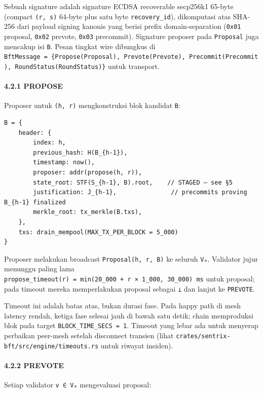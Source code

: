 \documentclass[11pt,a4paper]{article}
\begin{document}
Sebuah signature adalah signature ECDSA recoverable secp256k1 65-byte (compact \texttt{(r,\ s)} 64-byte plus satu byte \texttt{recovery\_id}), dikomputasi atas SHA-256 dari payload signing kanonis yang berisi prefix domain-separation (\texttt{0x01} proposal, \texttt{0x02} prevote, \texttt{0x03} precommit). Signature proposer pada \texttt{Proposal} juga mencakup isi \texttt{B}. Pesan tingkat wire dibungkus di \texttt{BftMessage\ =\ \{Propose(Proposal),\ Prevote(Prevote),\ Precommit(Precommit),\ RoundStatus(RoundStatus)\}} untuk transport.

\hypertarget{propose}{%
\paragraph{4.2.1 PROPOSE}\label{propose}}

Proposer untuk \texttt{(h,\ r)} mengkonstruksi blok kandidat \texttt{B}:

\begin{verbatim}
B = {
    header: {
        index: h,
        previous_hash: H(B_{h-1}),
        timestamp: now(),
        proposer: addr(propose(h, r)),
        state_root: STF(S_{h-1}, B).root,    // STAGED — see §5
        justification: J_{h-1},               // precommits proving B_{h-1} finalized
        merkle_root: tx_merkle(B.txs),
    },
    txs: drain_mempool(MAX_TX_PER_BLOCK = 5_000)
}
\end{verbatim}

Proposer melakukan broadcast \texttt{Proposal(h,\ r,\ B)} ke seluruh \texttt{Vₐ}. Validator jujur menunggu paling lama \texttt{propose\_timeout(r)\ =\ min(20\_000\ +\ r\ ×\ 1\_000,\ 30\_000)\ ms} untuk proposal; pada timeout mereka memperlakukan proposal sebagai \texttt{⊥} dan lanjut ke \texttt{PREVOTE}.

Timeout ini adalah batas atas, bukan durasi fase. Pada happy path di mesh latency rendah, ketiga fase selesai jauh di bawah satu detik; chain memproduksi blok pada target \texttt{BLOCK\_TIME\_SECS\ =\ 1}. Timeout yang lebar ada untuk menyerap perbaikan peer-mesh setelah disconnect transien (lihat \texttt{crates/sentrix-bft/src/engine/timeouts.rs} untuk riwayat insiden).

\hypertarget{prevote}{%
\paragraph{4.2.2 PREVOTE}\label{prevote}}

Setiap validator \texttt{v\ ∈\ Vₐ} mengevaluasi proposal:
\end{document}
